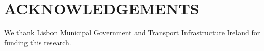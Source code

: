 \documentclass{isprs} %
\begin{document}
\section*{ACKNOWLEDGEMENTS}\label{ACKNOWLEDGEMENTS}
We thank Lisbon Municipal Government and Transport Infrastructure Ireland for funding this research.

% 
% 
% 
\end{document}
